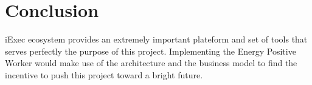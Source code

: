 \section{Conclusion}
    iExec ecosystem provides an extremely important plateform and set of tools that serves perfectly the purpose of
    this project. Implementing the Energy Positive Worker would make use of the architecture and the business
    model to find the incentive to push this project toward a bright future.